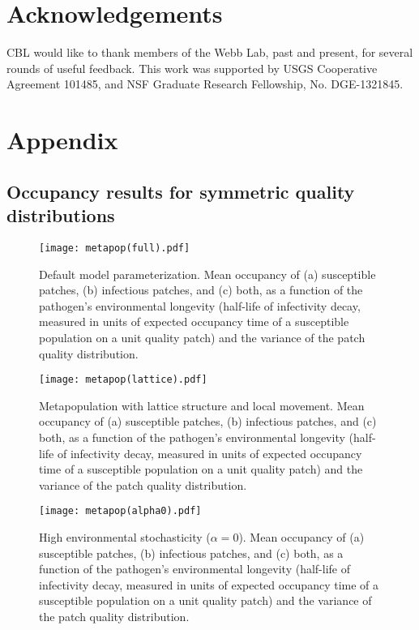 \documentclass{svjour3}
\begin{document}
\section{Acknowledgements}

CBL would like to thank members of the Webb Lab, past and present, for several rounds of useful feedback.  This work was supported by USGS Cooperative Agreement 101485, and NSF Graduate Research Fellowship, No. DGE-1321845.


\clearpage

\section{Appendix}

\subsection{Occupancy results for symmetric quality distributions}

\begin{figure}[h!]
\centering
\texttt{[image: metapop(full).pdf]}
\caption{Default model parameterization.  Mean occupancy of (a) susceptible patches, (b) infectious patches, and (c) both, as a function of the pathogen's environmental longevity (half-life of infectivity decay, measured in units of expected occupancy time of a susceptible population on a unit quality patch) and the variance of the patch quality distribution.}
\label{poutcome}
\end{figure}   

\begin{figure}[h!]
\centering
\texttt{[image: metapop(lattice).pdf]}
\caption{Metapopulation with lattice structure and local movement.  Mean occupancy of (a) susceptible patches, (b) infectious patches, and (c) both, as a function of the pathogen's environmental longevity (half-life of infectivity decay, measured in units of expected occupancy time of a susceptible population on a unit quality patch) and the variance of the patch quality distribution.}
\label{poutcome_lattice}
\end{figure}   

\begin{figure}[h!]
\centering
\texttt{[image: metapop(alpha0).pdf]}
\caption{High environmental stochasticity ($\alpha = 0$).  Mean occupancy of (a) susceptible patches, (b) infectious patches, and (c) both, as a function of the pathogen's environmental longevity (half-life of infectivity decay, measured in units of expected occupancy time of a susceptible population on a unit quality patch) and the variance of the patch quality distribution.}
\label{poutcome_x0}
\end{figure}   
\end{document}
